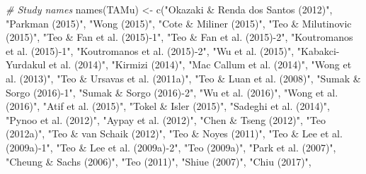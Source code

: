 \documentclass[
]{book}
\newenvironment{Shaded}{\begin{snugshade}}{\end{snugshade}}
\newcommand{\CommentTok}[1]{\textcolor[rgb]{0.56,0.35,0.01}{\textit{#1}}}
\newcommand{\FunctionTok}[1]{\textcolor[rgb]{0.00,0.00,0.00}{#1}}
\newcommand{\NormalTok}[1]{#1}
\newcommand{\OtherTok}[1]{\textcolor[rgb]{0.56,0.35,0.01}{#1}}
\newcommand{\StringTok}[1]{\textcolor[rgb]{0.31,0.60,0.02}{#1}}
\begin{document}
\begin{Shaded}
\begin{Highlighting}[]
\CommentTok{\# Study names}
\FunctionTok{names}\NormalTok{(TAMu) }\OtherTok{\textless{}{-}} \FunctionTok{c}\NormalTok{(}\StringTok{"Okazaki \& Renda dos Santos (2012)"}\NormalTok{,}
                    \StringTok{"Parkman (2015)"}\NormalTok{,}
                    \StringTok{"Wong (2015)"}\NormalTok{,}
                    \StringTok{"Cote \& Miliner (2015)"}\NormalTok{,}
                    \StringTok{"Teo \& Milutinovic (2015)"}\NormalTok{,}
                    \StringTok{"Teo \& Fan et al. (2015){-}1"}\NormalTok{,}
                    \StringTok{"Teo \& Fan et al. (2015){-}2"}\NormalTok{,}
                    \StringTok{"Koutromanos et al. (2015){-}1"}\NormalTok{,}
                    \StringTok{"Koutromanos et al. (2015){-}2"}\NormalTok{,}
                    \StringTok{"Wu et al. (2015)"}\NormalTok{,}
                    \StringTok{"Kabakci{-}Yurdakul et al. (2014)"}\NormalTok{,}
                    \StringTok{"Kirmizi (2014)"}\NormalTok{,}
                    \StringTok{"Mac Callum et al. (2014)"}\NormalTok{,}
                    \StringTok{"Wong et al. (2013)"}\NormalTok{,}
                    \StringTok{"Teo \& Ursavas et al. (2011a)"}\NormalTok{,}
                    \StringTok{"Teo \& Luan et al. (2008)"}\NormalTok{,}
                    \StringTok{"Sumak \& Sorgo (2016){-}1"}\NormalTok{,}
                    \StringTok{"Sumak \& Sorgo (2016){-}2"}\NormalTok{,}
                    \StringTok{"Wu et al. (2016)"}\NormalTok{,}
                    \StringTok{"Wong et al. (2016)"}\NormalTok{,}
                    \StringTok{"Atif et al. (2015)"}\NormalTok{,}
                    \StringTok{"Tokel \& Isler (2015)"}\NormalTok{,}
                    \StringTok{"Sadeghi et al. (2014)"}\NormalTok{,}
                    \StringTok{"Pynoo et al. (2012)"}\NormalTok{,}
                    \StringTok{"Aypay et al. (2012)"}\NormalTok{,}
                    \StringTok{"Chen \& Tseng (2012)"}\NormalTok{,}
                    \StringTok{"Teo (2012a)"}\NormalTok{,}
                    \StringTok{"Teo \& van Schaik (2012)"}\NormalTok{,}
                    \StringTok{"Teo \& Noyes (2011)"}\NormalTok{,}
                    \StringTok{"Teo \& Lee et al. (2009a){-}1"}\NormalTok{,}
                    \StringTok{"Teo \& Lee et al. (2009a){-}2"}\NormalTok{,}
                    \StringTok{"Teo (2009a)"}\NormalTok{,}
                    \StringTok{"Park et al. (2007)"}\NormalTok{,}
                    \StringTok{"Cheung \& Sachs (2006)"}\NormalTok{,}
                    \StringTok{"Teo (2011)"}\NormalTok{,}
                    \StringTok{"Shiue (2007)"}\NormalTok{,}
                    \StringTok{"Chiu (2017)"}\NormalTok{,}

\end{Highlighting}
\end{Shaded}
\end{document}
